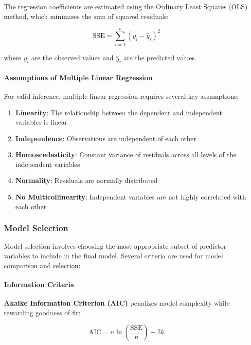 The regression coefficients are estimated using the Ordinary Least Squares (OLS) method, which minimizes the sum of squared residuals:

\begin{equation}
\text{SSE} = \sum_{i=1}^{n} (y_i - \hat{y}_i)^2
\end{equation}

where $y_i$ are the observed values and $\hat{y}_i$ are the predicted values.

\paragraph{Assumptions of Multiple Linear Regression}

For valid inference, multiple linear regression requires several key assumptions:

\begin{enumerate}
    \item \textbf{Linearity}: The relationship between the dependent and independent variables is linear
    \item \textbf{Independence}: Observations are independent of each other
    \item \textbf{Homoscedasticity}: Constant variance of residuals across all levels of the independent variables
    \item \textbf{Normality}: Residuals are normally distributed
    \item \textbf{No Multicollinearity}: Independent variables are not highly correlated with each other
\end{enumerate}

\subsubsection{Model Selection}

Model selection involves choosing the most appropriate subset of predictor variables to include in the final model. Several criteria are used for model comparison and selection:

\paragraph{Information Criteria}

\textbf{Akaike Information Criterion (AIC)} penalizes model complexity while rewarding goodness of fit:

\begin{equation}
\text{AIC} = n \ln\left(\frac{\text{SSE}}{n}\right) + 2k
\end{equation}

